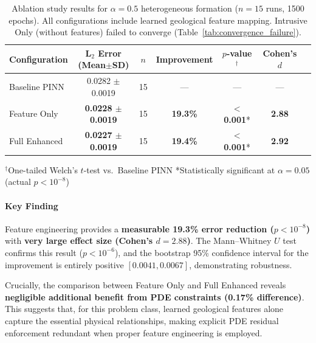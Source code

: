 \documentclass[sn-mathphys]{sn-jnl}
\begin{document}
\begin{table}[htbp]
	\centering
	\caption{Ablation study results for $\alpha=0.5$ heterogeneous formation 
		($n=15$ runs, 1500 epochs). All configurations include learned geological 
		feature mapping. Intrusive Only (without features) failed to converge 
		(Table~\ref{tab:convergence_failure}).}
	\label{tab:ablation}
	\begin{tabular}{@{}lcccccc@{}}
		\toprule
		\textbf{Configuration} & \textbf{L$_2$ Error (Mean$\pm$SD)} & 
		\textbf{$n$} & \textbf{Improvement} & \textbf{$p$-value$^\dagger$} & 
		\textbf{Cohen's $d$} \\
		\midrule
		Baseline PINN & 0.0282 $\pm$ 0.0019 & 15 & --- & --- & --- \\
		Feature Only & \textbf{0.0228 $\pm$ 0.0019} & 15 & \textbf{19.3\%} & 
		\textbf{$<$0.001}* & \textbf{2.88} \\
		Full Enhanced & \textbf{0.0227 $\pm$ 0.0019} & 15 & \textbf{19.4\%} & 
		\textbf{$<$0.001}* & \textbf{2.92} \\
		\bottomrule
	\end{tabular}
	\vspace{4pt}
		$^\dagger$One-tailed Welch's $t$-test vs.\ Baseline PINN 
	*Statistically significant at $\alpha=0.05$ (actual $p<10^{-8}$)
\end{table}

	
\paragraph{Key Finding}
Feature engineering provides a \textbf{measurable 19.3\% error reduction 
	($p<10^{-8}$)} with \textbf{very large effect size (Cohen's $d=2.88$)}. 
The Mann--Whitney $U$ test confirms this result ($p<10^{-6}$), and the 
bootstrap 95\% confidence interval for the improvement is entirely positive 
$[0.0041, 0.0067]$, demonstrating robustness. 

Crucially, the comparison between Feature Only and Full Enhanced reveals 
\textbf{negligible additional benefit from PDE constraints (0.17\% difference)}. 
This suggests that, for this problem class, learned geological features alone 
capture the essential physical relationships, making explicit PDE residual 
enforcement redundant when proper feature engineering is employed.	
		
\end{document}
